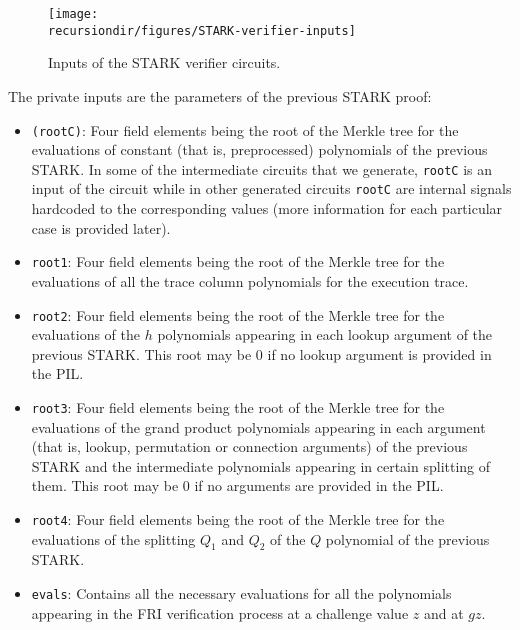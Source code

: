 \begin{figure}[H]
\centering
\texttt{[image: \\recursiondir/figures/STARK-verifier-inputs]}
\caption{Inputs of the STARK verifier circuits.}
\label{fig:stark-verifier-circuit}
\end{figure}

The private inputs are the parameters of the previous STARK proof:


\begin{itemize}

\item \texttt{(rootC)}: Four field elements being the root of the Merkle tree for the evaluations of constant (that is, preprocessed) polynomials of the previous STARK.
In some of the intermediate circuits that we generate, \texttt{rootC} is an input of the circuit while in other generated circuits \texttt{rootC} are internal signals 
hardcoded to the corresponding values (more information for each particular case is provided later).

\item \texttt{root1}: Four field elements being the root of the Merkle tree for the evaluations of all the trace column polynomials for the execution trace. 

\item \texttt{root2}: Four field elements being the root of the Merkle tree for the evaluations of the $h$ polynomials appearing in each lookup argument of the previous STARK. This root may be $0$ if no lookup argument is provided in the PIL.  

\item \texttt{root3}: Four field elements being the root of the Merkle tree for the evaluations of the grand product polynomials appearing in each argument (that is, lookup, permutation or connection arguments) of the previous STARK and the intermediate polynomials appearing in certain splitting of them. This root may be $0$ if no arguments are provided in the PIL. 

\item \texttt{root4}: Four field elements being the root of the Merkle tree for the evaluations of the splitting $Q_1$ and $Q_2$ of the $Q$ polynomial of the previous STARK.

\item \texttt{evals}: Contains all the necessary evaluations for all the polynomials appearing in the FRI verification process at a challenge value $z$ and at $gz$. 


\end{itemize}
